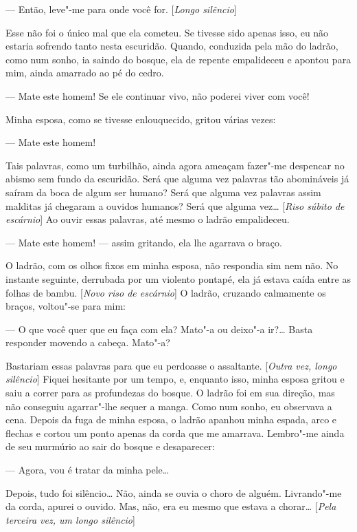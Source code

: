 --- Então, leve"-me para onde você for. [\textit{Longo silêncio}]

Esse não foi o único mal que ela cometeu. Se tivesse sido apenas isso,
eu não estaria sofrendo tanto nesta escuridão. Quando, conduzida pela
mão do ladrão, como num sonho, ia saindo do bosque, ela de repente
empalideceu e apontou para mim, ainda amarrado ao pé do cedro.

--- Mate este homem! Se ele continuar vivo, não poderei viver com você!

Minha esposa, como se tivesse enlouquecido, gritou várias vezes:

--- Mate este homem!

Tais palavras, como um turbilhão, ainda agora ameaçam fazer"-me despencar
no abismo sem fundo da escuridão. Será que alguma vez palavras tão
abomináveis já saíram da boca de algum ser humano? Será que alguma vez
palavras assim malditas já chegaram a ouvidos humanos? Será que alguma
vez\ldots{} [\textit{Riso súbito de escárnio}] Ao ouvir essas palavras, até mesmo o
ladrão empalideceu.

--- Mate este homem! --- assim gritando, ela lhe agarrava o braço.

O ladrão, com os olhos fixos em minha esposa, não respondia sim nem não.
No instante seguinte, derrubada por um violento pontapé, ela já estava
caída entre as folhas de bambu. [\textit{Novo riso de escárnio}] O ladrão,
cruzando calmamente os braços, voltou"-se para mim:

--- O que você quer que eu faça com ela? Mato"-a ou deixo"-a ir?\ldots{} Basta
responder movendo a cabeça. Mato"-a?

Bastariam essas palavras para que eu perdoasse o assaltante. [\textit{Outra vez,
longo silêncio}] Fiquei hesitante por um tempo, e, enquanto isso, minha
esposa gritou e saiu a correr para as profundezas do bosque. O ladrão
foi em sua direção, mas não conseguiu agarrar"-lhe sequer a manga. Como
num sonho, eu observava a cena. Depois da fuga de minha esposa, o
ladrão apanhou minha espada, arco e flechas e cortou um ponto apenas da
corda que me amarrava. Lembro"-me ainda de seu murmúrio ao sair do
bosque e desaparecer:

--- Agora, vou é tratar da minha pele\ldots{}

Depois, tudo foi silêncio\ldots{} Não, ainda se ouvia o choro de alguém.
Livrando"-me da corda, apurei o ouvido. Mas, não, era eu mesmo que
estava a chorar\ldots{} [\textit{Pela terceira vez, um longo silêncio}]

